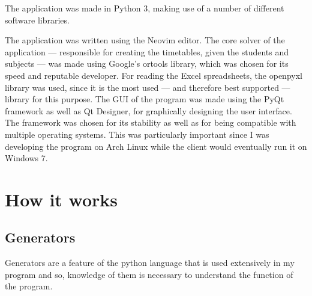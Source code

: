 \documentclass[12pt]{article}
\begin{document}
The application was made in Python 3, making use of a number of different software
libraries.  

The application was written using the Neovim \autocite{neovim} editor. The core solver of
the application --- responsible for creating the timetables, given the students and subjects
--- was made using Google's ortools \autocite{ortools} library, which was chosen for its
speed and reputable developer.  For reading the Excel spreadsheets, the
openpyxl\autocite{openpyxl} library was used, since it is the most used --- and therefore
best supported --- library for this purpose. The GUI of the program was made using the PyQt
framework as well as Qt Designer, for graphically designing the user interface. The
framework was chosen for its stability as well as for being compatible with multiple
operating systems. This was particularly important since I was developing the program on
Arch Linux while the client would eventually run it on Windows 7.


\section{How it works}

\subsection{Generators}

Generators are a feature of the python language that is used extensively in my program and
so, knowledge of them is necessary to understand the function of the program. 
\end{document}
